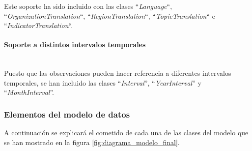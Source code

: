Este soporte ha sido incluido con las clases ``\textit{Language}``, ``\textit{OrganizationTranslation}``, ``\textit{RegionTranslation}``, ``\textit{TopicTranslation}`` e ``\textit{IndicatorTranslation}``.

\paragraph{Soporte a distintos intervalos temporales} \hfill \\
Puesto que las observaciones pueden hacer referencia a diferentes intervalos temporales, se han incluido las clases ``\textit{Interval}'', ``\textit{YearInterval}'' y ``\textit{MonthInterval}''.

\subsubsection{Elementos del modelo de datos}
A continuación se explicará el cometido de cada una de las clases del modelo que se han mostrado en la figura \ref{fig:diagrama_modelo_final}.

